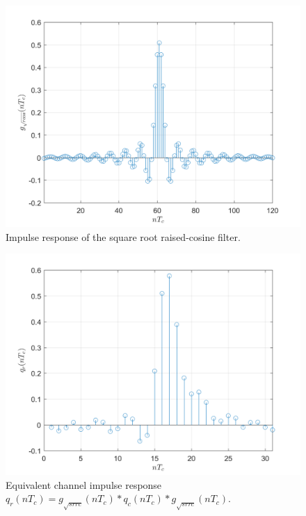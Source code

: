 \documentclass[a4paper, 12pt]{report}
\begin{document}
\begin{figure}[H]
	\centering
	\includegraphics[width=14cm]{gsrrc_1}
	\caption{Impulse response of the square root raised-cosine filter.}
\end{figure}

\begin{figure}[H]
	\centering
	\includegraphics[width=14cm]{qr}
	\caption{Equivalent channel impulse response $q_r(nT_c) = g_{\sqrt{srrc}}(nT_c)*q_c(nT_c)*g_{\sqrt{srrc}}(nT_c)$.}\label{}
\end{figure}
\end{document}
